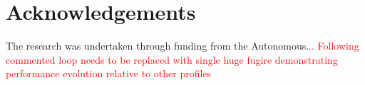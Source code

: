 \section{Acknowledgements} \label{sec:acknowledgements}
The research was undertaken through funding from the Autonomous...
\textcolor{red}{Following commented loop needs to be replaced with single huge fugire demonstrating performance evolution relative to other profiles}
%         
